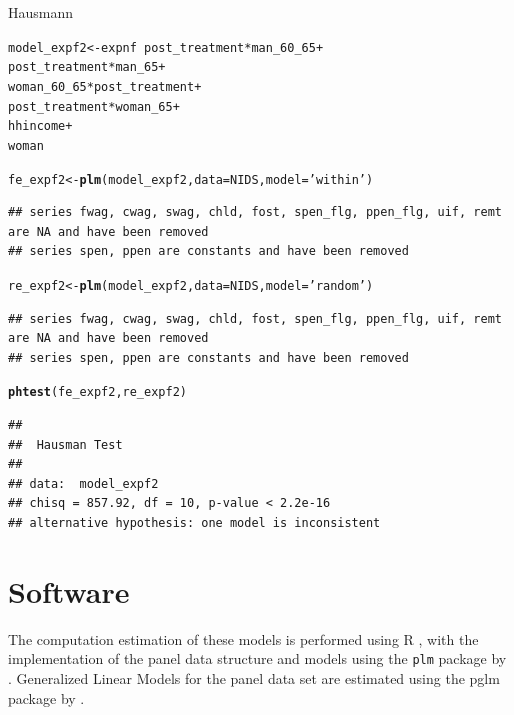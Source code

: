 \documentclass[a4paper,british]{article}\usepackage[]{graphicx}\usepackage[]{color}
\makeatletter
\newcommand{\hlstr}[1]{\textcolor[rgb]{0.192,0.494,0.8}{#1}}%
\newcommand{\hlopt}[1]{\textcolor[rgb]{0,0,0}{#1}}%
\newcommand{\hlstd}[1]{\textcolor[rgb]{0.345,0.345,0.345}{#1}}%
\newcommand{\hlkwb}[1]{\textcolor[rgb]{0.69,0.353,0.396}{#1}}%
\newcommand{\hlkwc}[1]{\textcolor[rgb]{0.333,0.667,0.333}{#1}}%
\newcommand{\hlkwd}[1]{\textcolor[rgb]{0.737,0.353,0.396}{\textbf{#1}}}%
\newenvironment{kframe}{%
 \def\at@end@of@kframe{}%
 \ifinner\ifhmode%
  \def\at@end@of@kframe{\end{minipage}}%
  \begin{minipage}{\columnwidth}%
 \fi\fi%
 \def\FrameCommand##1{\hskip\@totalleftmargin \hskip-\fboxsep
 \colorbox{shadecolor}{##1}\hskip-\fboxsep
     \hskip-\linewidth \hskip-\@totalleftmargin \hskip\columnwidth}%
 \MakeFramed {\advance\hsize-\width
   \@totalleftmargin\z@ \linewidth\hsize
   \@setminipage}}%
 {\par\unskip\endMakeFramed%
 \at@end@of@kframe}
\newenvironment{knitrout}{}{} %
\newcommand{\code}[1]{\texttt{#1}}
\makeatother
\begin{document}
\begin{table}[H]
\caption{Hausmann}

\begin{knitrout}
\color{fgcolor}\begin{kframe}
\begin{alltt}
\hlstd{model_expf2} \hlkwb{<-} \hlstd{expnf} \hlopt{~} \hlstd{post_treatment}\hlopt{*}\hlstd{man_60_65} \hlopt{+}
\hlstd{post_treatment}\hlopt{*}\hlstd{man_65} \hlopt{+}
\hlstd{woman_60_65}\hlopt{*}\hlstd{post_treatment} \hlopt{+}
\hlstd{post_treatment}\hlopt{*}\hlstd{woman_65} \hlopt{+}
\hlstd{hhincome} \hlopt{+}
\hlstd{woman}

\hlstd{fe_expf2} \hlkwb{<-} \hlkwd{plm}\hlstd{(model_expf2,} \hlkwc{data}\hlstd{=NIDS,} \hlkwc{model}\hlstd{=}\hlstr{'within'}\hlstd{)}
\end{alltt}
\begin{verbatim}
## series fwag, cwag, swag, chld, fost, spen_flg, ppen_flg, uif, remt are NA and have been removed
## series spen, ppen are constants and have been removed
\end{verbatim}
\begin{alltt}
\hlstd{re_expf2} \hlkwb{<-} \hlkwd{plm}\hlstd{(model_expf2,} \hlkwc{data}\hlstd{=NIDS,} \hlkwc{model}\hlstd{=}\hlstr{'random'}\hlstd{)}
\end{alltt}
\begin{verbatim}
## series fwag, cwag, swag, chld, fost, spen_flg, ppen_flg, uif, remt are NA and have been removed
## series spen, ppen are constants and have been removed
\end{verbatim}
\begin{alltt}
\hlkwd{phtest}\hlstd{(fe_expf2, re_expf2)}
\end{alltt}
\begin{verbatim}
## 
## 	Hausman Test
## 
## data:  model_expf2
## chisq = 857.92, df = 10, p-value < 2.2e-16
## alternative hypothesis: one model is inconsistent
\end{verbatim}
\end{kframe}
\end{knitrout}

\end{table}


\section{Software}

\label{sec:software}The computation estimation of these models is
performed using R \citep{R}, with the implementation of the panel
data structure and models using the \code{plm} package by \citet{croissant2008panel}.
Generalized Linear Models for the panel data set are estimated using
the pglm package by \citet{croissant2013pglm}.
\end{document}
